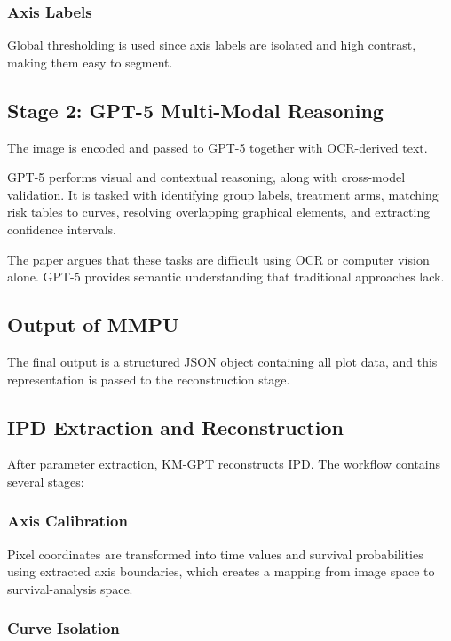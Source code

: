 \documentclass[11pt]{article}
\begin{document}
\subsubsection*{Axis Labels}

Global thresholding is used since axis labels are isolated and high contrast, making them easy to segment.


\subsection*{Stage 2: GPT-5 Multi-Modal Reasoning}

The image is encoded and passed to GPT-5 together with OCR-derived text.

GPT-5 performs visual and contextual reasoning, along with cross-model validation. It is tasked with identifying group labels, treatment arms, matching risk tables to curves, resolving overlapping graphical elements, and extracting confidence intervals.

The paper argues that these tasks are difficult using OCR or computer vision alone. GPT-5 provides semantic understanding that traditional approaches lack.

\subsection*{Output of MMPU}

The final output is a structured JSON object containing all plot data, and this representation is passed to the reconstruction stage.

\subsection*{IPD Extraction and Reconstruction}

After parameter extraction, KM-GPT reconstructs IPD. The workflow contains several stages:

\subsubsection*{Axis Calibration}

Pixel coordinates are transformed into time values and survival probabilities using extracted axis boundaries, which creates a mapping from image space to survival-analysis space.

\subsubsection*{Curve Isolation}
\end{document}

